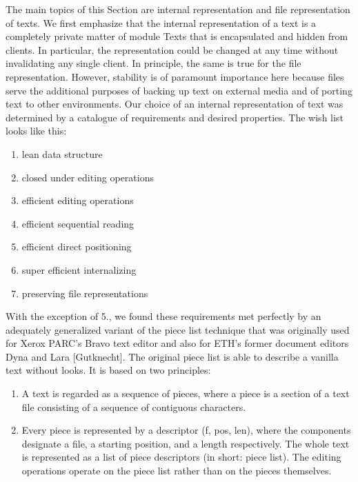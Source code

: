 The main topics of this Section are internal representation and file representation of texts. We first
emphasize that the internal representation of a text is a completely private matter of module Texts
that is encapsulated and hidden from clients. In particular, the representation could be changed at
any time without invalidating any single client. In principle, the same is true for the file
representation. However, stability is of paramount importance here because files serve the
additional purposes of backing up text on external media and of porting text to other environments.
Our choice of an internal representation of text was determined by a catalogue of requirements and
desired properties. The wish list looks like this:
\begin{enumerate}
  \item lean data structure
  \item closed under editing operations
  \item efficient editing operations
  \item efficient sequential reading
  \item efficient direct positioning
  \item super efficient internalizing
  \item preserving file representations
\end{enumerate}
With the exception of 5., we found these requirements met perfectly by an adequately generalized
variant of the piece list technique that was originally used for Xerox PARC's Bravo text editor and
also for ETH's former document editors Dyna and Lara [Gutknecht]. The original piece list is able to
describe a vanilla text without looks. It is based on two principles:
\begin{enumerate}
  \item A text is regarded as a sequence of pieces, where a piece is a section of a text file consisting of
a sequence of contiguous characters.
  \item Every piece is represented by a descriptor (f, pos, len), where the components designate a file,
a starting position, and a length respectively. The whole text is represented as a list of piece
descriptors (in short: piece list). The editing operations operate on the piece list rather than on the
pieces themselves.
\end{enumerate}

